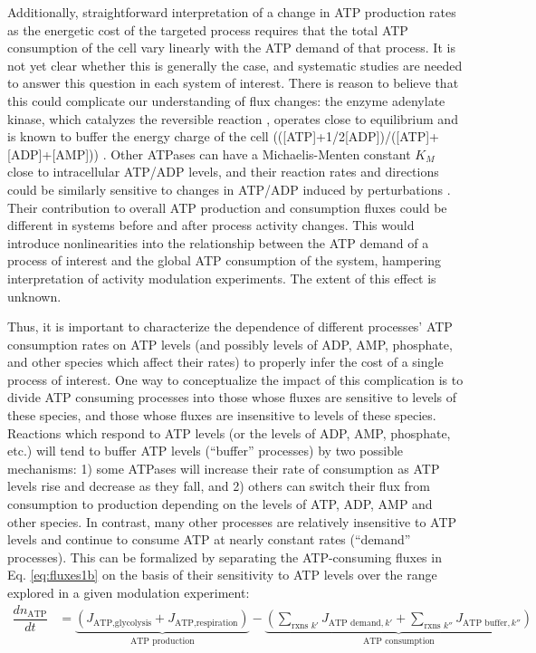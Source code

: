 \documentclass{compactarticle}
\begin{document}
Additionally, straightforward interpretation of a change in ATP production rates as the energetic cost of the targeted process requires that the total ATP consumption of the cell vary linearly with the ATP demand of that process. It is not yet clear whether this is generally the case, and systematic studies are needed to answer this question in each system of interest. There is reason to believe that this could complicate our understanding of flux changes: the enzyme adenylate kinase, which catalyzes the reversible reaction , operates close to equilibrium and is known to buffer the energy charge of the cell (([ATP]+1/2[ADP])/([ATP]+[ADP]+[AMP])) \cite{delafuente2014}. Other ATPases can have a Michaelis-Menten constant $K_M$ close to intracellular ATP/ADP levels, and their reaction rates and directions could be similarly sensitive to changes in ATP/ADP induced by perturbations \cite{buttgereit1995hierarchy,park2016metabolite}. Their contribution to overall ATP production and consumption fluxes could be different in systems before and after process activity changes. This would introduce nonlinearities into the relationship between the ATP demand of a process of interest and the global ATP consumption of the system, hampering interpretation of activity modulation experiments. The extent of this effect is unknown.

Thus, it is important to characterize the dependence of different processes' ATP consumption rates on ATP levels (and possibly levels of ADP, AMP, phosphate, and other species which affect their rates) to properly infer the cost of a single process of interest. One way to conceptualize the impact of this complication is to divide ATP consuming processes into those whose fluxes are sensitive to levels of these species, and those whose fluxes are insensitive to levels of these species. Reactions which respond to ATP levels (or the levels of ADP, AMP, phosphate, etc.) will tend to buffer ATP levels (``buffer'' processes) by two possible mechanisms: 1) some ATPases will increase their rate of consumption as ATP levels rise and decrease as they fall, and 2) others can switch their flux from consumption to production depending on the levels of ATP, ADP, AMP and other species. In contrast, many other processes are relatively insensitive to ATP levels and continue to consume ATP at nearly constant rates (``demand'' processes). This can be formalized by separating the ATP-consuming fluxes in Eq. \ref{eq:fluxes1b} on the basis of their sensitivity to ATP levels over the range explored in a given modulation experiment:
\begin{align}
    \dfrac{dn_\text{ATP}}{dt} &= \underbrace{\left( J_\text{ATP,glycolysis} + J_\text{ATP,respiration} \right)}_{\text{ATP production}} - \underbrace{ \left( \sum_{\text{rxns } k'} J_{\text{ATP demand},k'} + \sum_{\text{rxns } k''} J_{\text{ATP buffer},k''} \right)}_{\text{ATP consumption}}
    \label{eq:fluxes1c}
\end{align}
\end{document}
